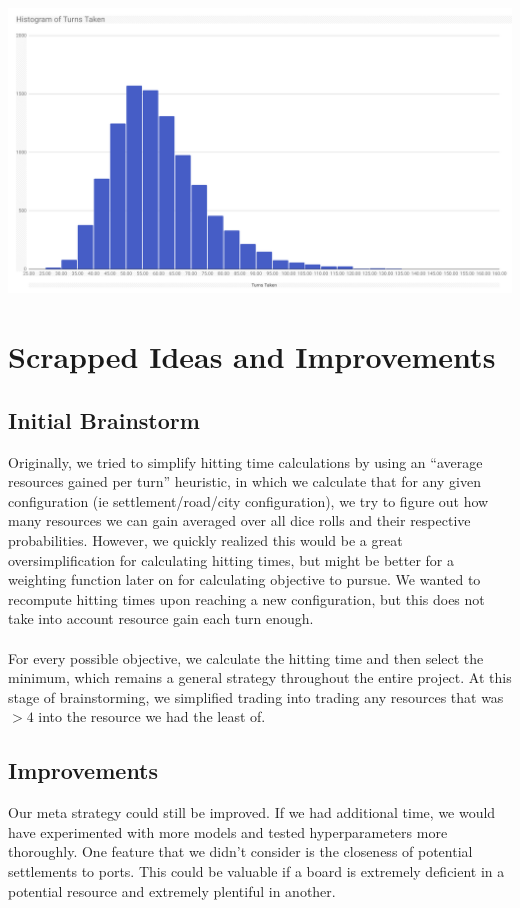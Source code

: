 \documentclass{article}
\begin{document}
\includegraphics[scale=.18]{histogram.png}

\section*{Scrapped Ideas and Improvements}

\subsection*{Initial Brainstorm}

Originally, we tried to simplify hitting time calculations by using an “average resources gained per turn” heuristic, in which we calculate that for any given configuration (ie settlement/road/city configuration), we try to figure out how many resources we can gain averaged over all dice rolls and their respective probabilities. However, we quickly realized this would be a great oversimplification for calculating hitting times, but might be better for a weighting function later on for calculating objective to pursue. We wanted to recompute hitting times upon reaching a new configuration, but this does not take into account resource gain each turn enough. \\ \\
For every possible objective, we calculate the hitting time and then select the minimum, which remains a general strategy throughout the entire project. At this stage of brainstorming, we simplified trading into trading any resources that was $> 4$ into the resource we had the least of. 


\subsection*{Improvements}

Our meta strategy could still be improved. If we had additional time, we would have experimented with more models and tested hyperparameters more thoroughly. One feature that we didn’t consider is the closeness of potential settlements to ports. This could be valuable if a board is extremely deficient in a potential resource and extremely plentiful in another.
\end{document}
